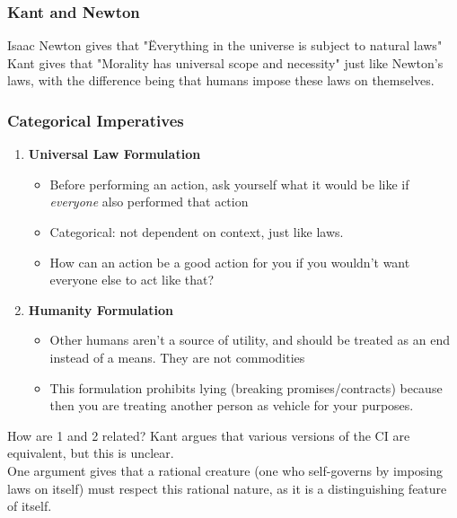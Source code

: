 \documentclass{article}
\begin{document}
        \subsubsection{Kant and Newton}
        Isaac Newton gives that "Ëverything in the universe is subject to natural laws"
        \\Kant gives that "Morality has universal scope and necessity" just like Newton's laws, with the difference being that humans impose these laws on themselves.
        
        \subsubsection{Categorical Imperatives}
        \begin{enumerate}
            \item \textbf{Universal Law Formulation}
            \begin{itemize}
                \item Before performing an action, ask yourself what it would be like if \textit{everyone} also performed that action
                \item Categorical: not dependent on context, just like laws.
                \item How can an action be a good action for you if you wouldn't want everyone else to act like that?
            \end{itemize}{}
            \item \textbf{Humanity Formulation}
            \begin{itemize}
                \item Other humans aren't a source of utility, and should be treated as an end instead of a means. They are not commodities
                \item This formulation prohibits lying (breaking promises/contracts) because then you are treating another person as vehicle for your purposes.
            \end{itemize}
        \end{enumerate}{}
        How are 1 and 2 related? Kant argues that various versions of the CI are equivalent, but this is unclear. 
        \\One argument gives that a rational creature (one who self-governs by imposing laws on itself) must respect this rational nature, as it is a distinguishing feature of itself.
        
\end{document}
